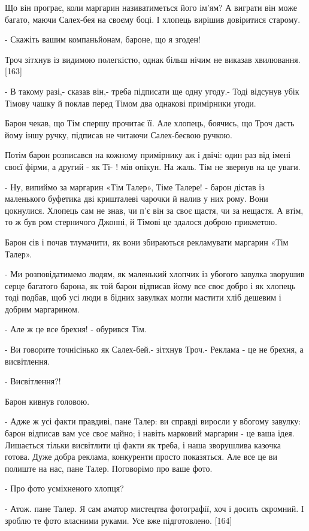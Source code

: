 Що він програє, коли маргарин називатиметься його ім'ям? А виграти він може багато, маючи Салех-бея на своєму боці. І хлопець вирішив довіритися старому.

- Скажіть вашим компаньйонам, бароне, що я згоден!

Троч зітхнув із видимою полегкістю, однак більш нічим не виказав хвилювання. [163]

- В такому разі,- сказав він,- треба підписати ще одну угоду.- Тоді відсунув убік Тімову чашку й поклав перед Тімом два однакові примірники угоди.

Барон чекав, що Тім спершу прочитає її. Але хлопець, боячись, що Троч дасть йому іншу ручку, підписав не читаючи Салех-беєвою ручкою.

Потім барон розписався на кожному примірнику аж і двічі: один раз від імені своєї фірми, а другий - як Ті- ! мів опікун. На жаль. Тім не звернув на це уваги.

- Ну, випиймо за маргарин «Тім Талер», Тіме Талере! - барон дістав із маленького буфетика дві кришталеві чарочки й налив у них рому. Вони цокнулися. Хлопець сам не знав, чи п'є він за своє щастя, чи за нещастя. А втім, то ж був ром стерничого Джонні, й Тімові це здалося доброю прикметою.

Барон сів і почав тлумачити, як вони збираються рекламувати маргарин «Тім Талер».

- Ми розповідатимемо людям, як маленький хлопчик із убогого завулка зворушив серце багатого барона, як той барон відписав йому все своє добро і як хлопець тоді подбав, щоб усі люди в бідних завулках могли мастити хліб дешевим і добрим маргарином.

- Але ж це все брехня! - обурився Тім.

- Ви говорите точнісінько як Салех-бей.- зітхнув Троч.- Реклама - це не брехня, а висвітлення.

- Висвітлення?!

Барон кивнув головою.

- Адже ж усі факти правдиві, пане Талер: ви справді виросли у вбогому завулку: барон відписав вам усе своє майно; і навіть марковий маргарин - це ваша ідея. Лишається тільки висвітлити ці факти як треба, і наша зворушлива казочка готова. Дуже добра реклама, конкуренти просто показяться. Але все це ви полиште на нас, пане Талер. Поговорімо про ваше фото.

- Про фото усміхненого хлопця?

- Атож. пане Талер. Я сам аматор мистецтва фотографії, хоч і досить скромний. І зроблю те фото власними руками. Усе вже підготовлено. [164]

